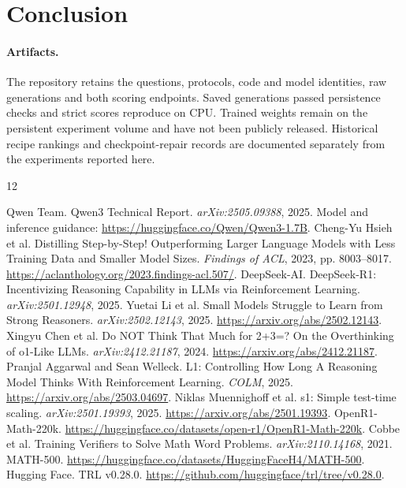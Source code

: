 \documentclass[11pt]{article}
\begin{document}
\section{Conclusion}


\paragraph{Artifacts.}
The repository retains the questions, protocols, code and model identities, raw generations and both scoring endpoints. Saved generations passed persistence checks and strict scores reproduce on CPU. Trained weights remain on the persistent experiment volume and have not been publicly released. Historical recipe rankings and checkpoint-repair records are documented separately from the experiments reported here.

\begin{thebibliography}{12}
\raggedright\small
{} Qwen Team. Qwen3 Technical Report. \emph{arXiv:2505.09388}, 2025. Model and inference guidance: \url{https://huggingface.co/Qwen/Qwen3-1.7B}.
 Cheng-Yu Hsieh et al. Distilling Step-by-Step! Outperforming Larger Language Models with Less Training Data and Smaller Model Sizes. \emph{Findings of ACL}, 2023, pp. 8003--8017. \url{https://aclanthology.org/2023.findings-acl.507/}.
 DeepSeek-AI. DeepSeek-R1: Incentivizing Reasoning Capability in LLMs via Reinforcement Learning. \emph{arXiv:2501.12948}, 2025.
 Yuetai Li et al. Small Models Struggle to Learn from Strong Reasoners. \emph{arXiv:2502.12143}, 2025. \url{https://arxiv.org/abs/2502.12143}.
 Xingyu Chen et al. Do NOT Think That Much for 2+3=? On the Overthinking of o1-Like LLMs. \emph{arXiv:2412.21187}, 2024. \url{https://arxiv.org/abs/2412.21187}.
 Pranjal Aggarwal and Sean Welleck. L1: Controlling How Long A Reasoning Model Thinks With Reinforcement Learning. \emph{COLM}, 2025. \url{https://arxiv.org/abs/2503.04697}.
 Niklas Muennighoff et al. s1: Simple test-time scaling. \emph{arXiv:2501.19393}, 2025. \url{https://arxiv.org/abs/2501.19393}.
 OpenR1-Math-220k. \url{https://huggingface.co/datasets/open-r1/OpenR1-Math-220k}.
 Cobbe et al. Training Verifiers to Solve Math Word Problems. \emph{arXiv:2110.14168}, 2021.
 MATH-500. \url{https://huggingface.co/datasets/HuggingFaceH4/MATH-500}.
 Hugging Face. TRL v0.28.0. \url{https://github.com/huggingface/trl/tree/v0.28.0}.
\end{thebibliography}
\clearpage
\appendix
\end{document}
